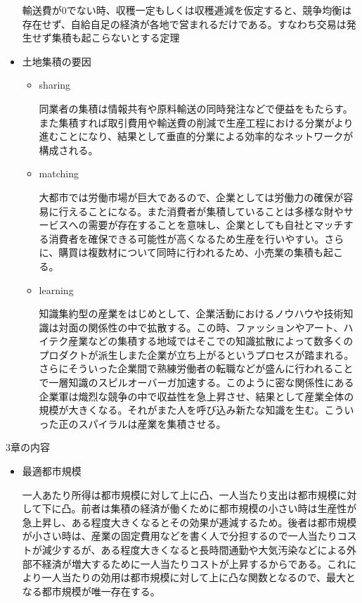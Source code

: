 \documentclass{jsarticle}
\begin{document}
\begin{itemize}
輸送費が0でない時、収穫一定もしくは収穫逓減を仮定すると、競争均衡は存在せず、自給自足の経済が各地で営まれるだけである。すなわち交易は発生せず集積も起こらないとする定理
\item 土地集積の要因
	\begin{itemize}
        \item sharing
        
        同業者の集積は情報共有や原料輸送の同時発注などで便益をもたらす。また集積すれば取引費用や輸送費の削減で生産工程における分業がより進むことになり、結果として垂直的分業による効率的なネットワークが構成される。
        \item matching
        
        大都市では労働市場が巨大であるので、企業としては労働力の確保が容易に行えることになる。また消費者が集積していることは多様な財やサービスへの需要が存在することを意味し、企業としても自社とマッチする消費者を確保できる可能性が高くなるため生産を行いやすい。さらに、購買は複数材について同時に行われるため、小売業の集積も起こる。
        \item learning
        
        知識集約型の産業をはじめとして、企業活動におけるノウハウや技術知識は対面の関係性の中で拡散する。この時、ファッションやアート、ハイテク産業などの集積する地域ではそこでの知識拡散によって数多くのプロダクトが派生しまた企業が立ち上がるというプロセスが踏まれる。さらにそういった企業間で熟練労働者の転職などが盛んに行われることで一層知識のスピルオーバーガ加速する。このように密な関係性にある企業軍は熾烈な競争の中で収益性を急上昇させ、結果として産業全体の規模が大きくなる。それがまた人を呼び込み新たな知識を生む。こういった正のスパイラルは産業を集積させる。
        \end{itemize}
\end{itemize}

3章の内容
\begin{itemize}
\item 最適都市規模

一人あたり所得は都市規模に対して上に凸、一人当たり支出は都市規模に対して下に凸。前者は集積の経済が働くために都市規模の小さい時は生産性が急上昇し、ある程度大きくなるとその効果が逓減するため。後者は都市規模が小さい時は、産業の固定費用などを書く人で分担するので一人当たりコストが減少するが、ある程度大きくなると長時間通勤や大気汚染などによる外部不経済が増大するために一人当たりコストが上昇するからである。これにより一人当たりの効用は都市規模に対して上に凸な関数となるので、最大となる都市規模が唯一存在する。
\end{itemize}
\end{document}
